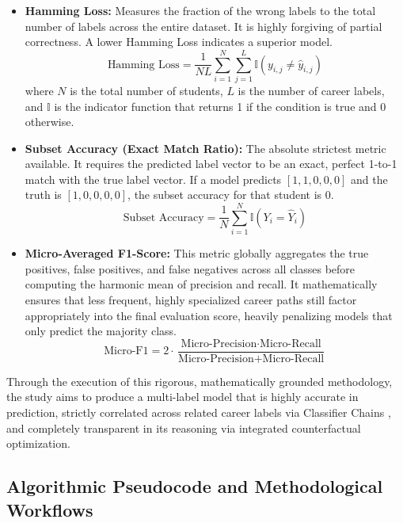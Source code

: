 \begin{itemize}
    \item \textbf{Hamming Loss:} Measures the fraction of the wrong labels to the total number of labels across the entire dataset. It is highly forgiving of partial correctness. A lower Hamming Loss indicates a superior model.
    \[
    \text{Hamming Loss} = \frac{1}{N L} \sum_{i=1}^{N} \sum_{j=1}^{L} \mathbb{I}(y_{i,j} \neq \hat{y}_{i,j})
    \]
    where $N$ is the total number of students, $L$ is the number of career labels, and $\mathbb{I}$ is the indicator function that returns 1 if the condition is true and 0 otherwise.
    
    \item \textbf{Subset Accuracy (Exact Match Ratio):} The absolute strictest metric available. It requires the predicted label vector to be an exact, perfect 1-to-1 match with the true label vector. If a model predicts $[1, 1, 0, 0, 0]$ and the truth is $[1, 0, 0, 0, 0]$, the subset accuracy for that student is 0.
    \[
    \text{Subset Accuracy} = \frac{1}{N} \sum_{i=1}^{N} \mathbb{I}(Y_i = \hat{Y}_i)
    \]
    
    \item \textbf{Micro-Averaged F1-Score:} This metric globally aggregates the true positives, false positives, and false negatives across all classes before computing the harmonic mean of precision and recall. It mathematically ensures that less frequent, highly specialized career paths still factor appropriately into the final evaluation score, heavily penalizing models that only predict the majority class.
    \[
    \text{Micro-F1} = 2 \cdot \frac{\text{Micro-Precision} \cdot \text{Micro-Recall}}{\text{Micro-Precision} + \text{Micro-Recall}}
    \]
\end{itemize}

Through the execution of this rigorous, mathematically grounded methodology, the study aims to produce a multi-label \parencite{tsoumakas2007multi} model that is highly accurate in prediction, strictly correlated across related career labels via Classifier Chains \parencite{read2011classifier}, and completely transparent in its reasoning via integrated counterfactual \parencite{wachter2017counterfactual} optimization.



\subsection{Algorithmic Pseudocode and Methodological Workflows}

